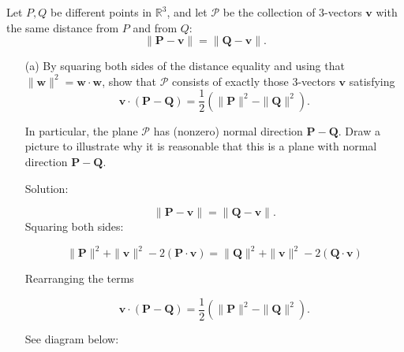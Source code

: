 Let $P, Q$ be different points in $\mathbb{R}^3$, and let $\mathcal{P}$ be the collection of 3-vectors $\mathbf{v}$ with the same distance from $P$ and from $Q$: 
\[
\|\mathbf{P} - \mathbf{v}\| = \|\mathbf{Q} - \mathbf{v}\|.
\]

\begin{enumerate}
    \item[(a)] By squaring both sides of the distance equality and using that $\|\mathbf{w}\|^2 = \mathbf{w} \cdot \mathbf{w}$, show that $\mathcal{P}$ consists of exactly those 3-vectors $\mathbf{v}$ satisfying
    \[
    \mathbf{v} \cdot (\mathbf{P} - \mathbf{Q}) = \frac{1}{2} \left(\|\mathbf{P}\|^2 - \|\mathbf{Q}\|^2\right).
    \]

    In particular, the plane $\mathcal{P}$ has (nonzero) normal direction $\mathbf{P} - \mathbf{Q}$. Draw a picture to illustrate why it is reasonable that this is a plane with normal direction $\mathbf{P} - \mathbf{Q}$.

    Solution:

    \[\|\mathbf{P} - \mathbf{v}\| = \|\mathbf{Q} - \mathbf{v}\|.\]
    Squaring both sides:
    
 
      \[\|\mathbf{P}\|^2 +  \|\mathbf{v}\|^2 - 2(\mathbf{P}\cdot \mathbf{v})= \|\mathbf{Q}\|^2 +  \|\mathbf{v}\|^2 - 2(\mathbf{Q}\cdot \mathbf{v})\] 
        
        Rearranging the terms
        
       \[
    \mathbf{v} \cdot (\mathbf{P} - \mathbf{Q}) = \frac{1}{2} \left(\|\mathbf{P}\|^2 - \|\mathbf{Q}\|^2\right).
    \]
    
    See diagram below:


\end{enumerate}
